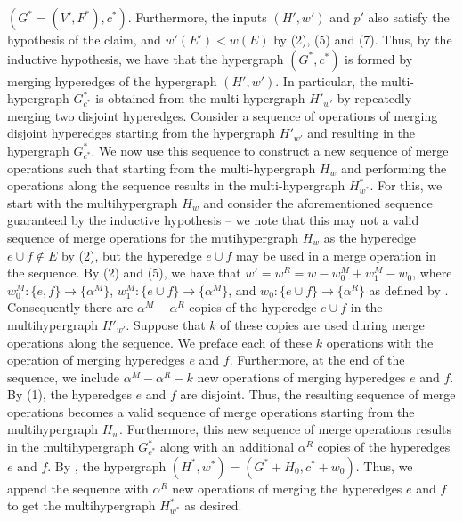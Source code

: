     
    $(G^* = (V', F^*), c^*)$. Furthermore, the inputs 
$(H', w')$ and $p'$ also satisfy the hypothesis of the claim, and $w'(E') < w(E)$ by (2), (5) and (7). Thus, by the inductive hypothesis, we have that the hypergraph $(G^*, c^*)$ is formed by merging hyperedges of the hypergraph $(H', w')$. In particular, the multi-hypergraph $G^*_{c^*}$ is obtained from the multi-hypergraph $H'_{w'}$ by repeatedly merging two disjoint hyperedges. Consider a sequence of operations of merging disjoint hyperedges starting from the hypergraph $H'_{w'}$ and resulting in the hypergraph $G^*_{c^*}$. We now use this sequence to construct a new sequence of merge operations such that starting from the multi-hypergraph $H_w$ and performing the operations along the sequence results in the multi-hypergraph $H^*_{w^*}$. For this, we start with the multihypergraph $H_w$ and consider the aforementioned sequence guaranteed by the inductive hypothesis  --  we note that this may not a valid sequence of merge operations for the mutihypergraph $H_w$ as the hyperedge $e\cup f \not \in E$ by (2), but the hyperedge $e\cup f$ may be used in a merge operation in the sequence. By (2) and (5), we have that $w' = w^R = w - w_0^M + w_1^M - w_0$, where $w_0^M:\{e, f\}\rightarrow\{\alpha^M\}$, $w_1^M:\{e\cup f\} \rightarrow\{\alpha^M\}$, and $w_0:\{e\cup f\}\rightarrow\{\alpha^R\}$ as defined by . Consequently there are $\alpha^M - \alpha^R$ copies of the hyperedge $e\cup f$ in the multihypergraph $H'_{w'}$. Suppose that $k$ of these copies are used during merge operations along the sequence. We preface each of these $k$ operations with the operation of merging hyperedges $e$ and $f$. Furthermore, at the end of the sequence, we include $\alpha^M - \alpha^R - k$ new operations of merging hyperedges $e$ and $f$. By (1), the hyperedges $e$ and $f$ are disjoint. Thus, the resulting sequence of merge operations becomes a valid sequence of merge operations starting from the multihypergraph $H_w$. Furthermore, this new sequence of merge operations results in the multihypergraph $G^*_{c^*}$ along with an additional $\alpha^R$ copies of the hyperedges $e$ and $f$. By  , the hypergraph $(H^*, w^*) = (G^* + H_0, c^* + w_0)$. Thus, we append the sequence with $\alpha^R$ new operations of merging the hyperedges $e$ and $f$ to get the multihypergraph $H^*_{w^*}$ as desired.
\fi

